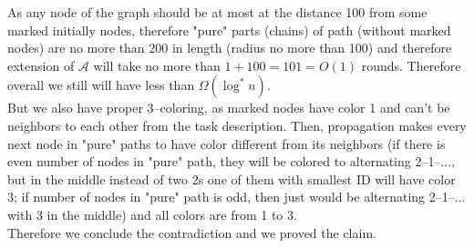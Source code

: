 \documentclass[]{article}
\begin{document}
	 As any node of the graph should be at most at the distance 100 from some marked initially nodes, therefore "pure" parts (chains) of path (without marked nodes) are no more than 200 in length (radius no more than 100) and therefore extension of $\mathcal{A}$ will take no more than $1+100=101=O(1)$ rounds. Therefore overall we still will have less than $\Omega(\log^*n)$.\\
	 But we also have proper 3--coloring, as marked nodes have color 1 and can't be neighbors to each other from the task description. Then, propagation makes every next node in "pure" paths to have color different from its neighbors (if there is even number of nodes in "pure" path, they will be colored to alternating 2--1--..., but in the middle instead of two 2s one of them with smallest ID will have color 3; if number of nodes in "pure" path is odd, then just would be alternating 2--1--... with 3 in the middle) and all colors are from 1 to 3.\\
	 
	 Therefore we conclude the contradiction and we proved the claim.



\end{document}
